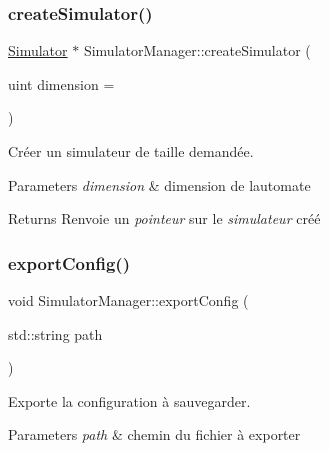 \subsubsection{\texorpdfstring{create\+Simulator()}{createSimulator()}}
{\footnotesize\ttfamily \mbox{\hyperlink{class_simulator}{Simulator}} $\ast$ Simulator\+Manager\+::create\+Simulator (\begin{DoxyParamCaption}\item[{uint}]{dimension = {} }\end{DoxyParamCaption})}



Créer un simulateur de taille demandée. 


\begin{DoxyParams}{Parameters}
{\em dimension} & dimension de l\textquotesingle{}automate \\
\hline
\end{DoxyParams}
\begin{DoxyReturn}{Returns}
Renvoie un {\itshape pointeur} sur le {\itshape simulateur} créé 
\end{DoxyReturn}
\mbox{\label{class_simulator_manager_aec08912c275853dde6469bdb98067063}} 
\subsubsection{\texorpdfstring{export\+Config()}{exportConfig()}}
{\footnotesize\ttfamily void Simulator\+Manager\+::export\+Config (\begin{DoxyParamCaption}\item[{std\+::string}]{path }\end{DoxyParamCaption})}



Exporte la configuration à sauvegarder. 


\begin{DoxyParams}{Parameters}
{\em path} & chemin du fichier à exporter \\
\hline
\end{DoxyParams}
\mbox{\label{class_simulator_manager_a9a3c8a76c720b2539d67d812c967eb5c}} 
